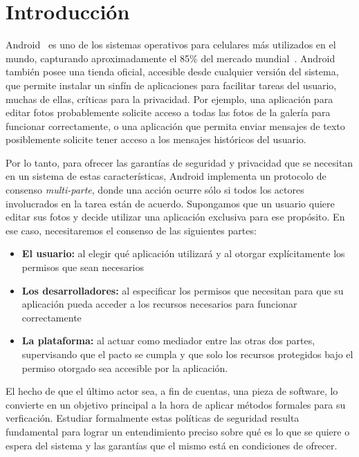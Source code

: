 \chapter{Introducción}

Android~\cite{android-proyect} es uno de los sistemas operativos para celulares más utilizados en el
mundo, capturando aproximadamente el 85\% del mercado mundial~\cite{idc-report}. Android también
posee una tienda oficial, accesible desde cualquier versión del sistema, que permite instalar un
sinfín de aplicaciones para facilitar tareas del usuario, muchas de ellas, críticas para la
privacidad. Por ejemplo, una aplicación para editar fotos probablemente solicite acceso a todas las
fotos de la galería para funcionar correctamente, o una aplicación que permita enviar mensajes de
texto posiblemente solicite tener acceso a los mensajes históricos del usuario.

Por lo tanto, para ofrecer las garantías de seguridad y privacidad que se necesitan en un sistema de
estas características, Android implementa un protocolo de consenso \textit{multi-parte}, donde una
acción ocurre sólo si todos los actores involucrados en la tarea están de acuerdo. Supongamos que un
usuario quiere editar sus fotos y decide utilizar una aplicación exclusiva para ese propósito. En
ese caso, necesitaremos el consenso de las siguientes partes:

\begin{itemize}
    \item \textbf{El usuario:} al elegir qué aplicación utilizará y al otorgar explícitamente los
          permisos que sean necesarios
    \item \textbf{Los desarrolladores:} al especificar los permisos que necesitan para que su
          aplicación pueda acceder a los recursos necesarios para funcionar correctamente
    \item \textbf{La plataforma:} al actuar como mediador entre las otras dos partes,
          supervisando que el pacto se cumpla y que solo los recursos protegidos bajo el permiso
          otorgado sea accesible por la aplicación.
\end{itemize}

El hecho de que el último actor sea, a fin de cuentas, una pieza de software, lo convierte en un
objetivo principal a la hora de aplicar métodos formales para su verficación. Estudiar formalmente
estas políticas de seguridad resulta fundamental para lograr un entendimiento preciso sobre qué es
lo que se quiere o espera del sistema y las garantías que el mismo está en condiciones de ofrecer.

